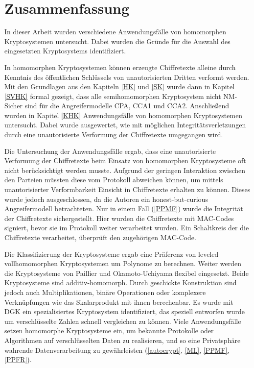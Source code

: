 \chapter{Zusammenfassung}

In dieser Arbeit wurden verschiedene Anwendungsfälle von homomorphen Kryptosystemen untersucht. Dabei wurden die Gründe für die Auswahl des eingesetzten Kryptosystems identifiziert.

In homomorphen Kryptosystemen können erzeugte Chiffretexte alleine durch Kenntnis des öffentlichen Schlüssels von unautorisierten Dritten verformt werden. Mit den Grundlagen aus den Kapiteln \ref{HK} und \ref{SK} wurde dann in Kapitel \ref{SVHK} formal gezeigt, dass alle semihomomorphen Kryptosystem nicht NM-Sicher sind für die Angreifermodelle CPA, CCA1 und CCA2. Anschließend wurden in Kapitel \ref{KHK} Anwendungsfälle von homomorphen Kryptosystemen untersucht. Dabei wurde ausgewertet, wie mit möglichen Integritätsverletzungen durch eine unautorisierte Verformung der Chiffretexte umgegangen wird.

Die Untersuchung der Anwendungsfälle ergab, dass eine unautorisierte Verformung der Chiffretexte beim Einsatz von homomorphen Kryptosysteme oft nicht berücksichtigt werden musste. Aufgrund der geringen Interaktion zwischen den Parteien müssten diese vom Protokoll abweichen können, um mittels unautorisierter Verformbarkeit Einsicht in Chiffretexte erhalten zu können. Dieses wurde jedoch ausgeschlossen, da die Autoren ein honest-but-curious Angreifermodell betrachteten. Nur in einem Fall (\ref{PPMF}) wurde die Integrität der Chiffretexte sichergestellt. Hier wurden die Chiffretexte mit MAC-Codes signiert, bevor sie im Protokoll weiter verarbeitet wurden. Ein Schaltkreis der die Chiffretexte verarbeitet, überprüft den zugehörigen MAC-Code.

Die Klassifizierung der Kryptosysteme ergab eine Präferenz von leveled vollhomomorphen Kryptosystemen um Polynome zu berechnen. Weiter werden die Kryptosysteme von Paillier und Okamoto-Uchiyama flexibel eingesetzt. Beide Kryptosysteme sind additiv-homomorph. Durch geschickte Konstruktion sind jedoch auch Multiplikationen, binäre Operationen oder komplexere Verknüpfungen wie das Skalarprodukt mit ihnen berechenbar. Es wurde mit DGK ein spezialisiertes Kryptosystem identifiziert, das speziell entworfen wurde um verschlüsselte Zahlen schnell vergleichen zu können. Viele Anwendungsfälle setzen homomorphe Kryptosysteme ein, um bekannte Protokolle oder Algorithmen auf verschlüsselten Daten zu realisieren, und so eine Privatsphäre wahrende Datenverarbeitung zu gewährleisten (\ref{autocrypt}, \ref{ML}, \ref{PPMF}, \ref{PPFR}). %

